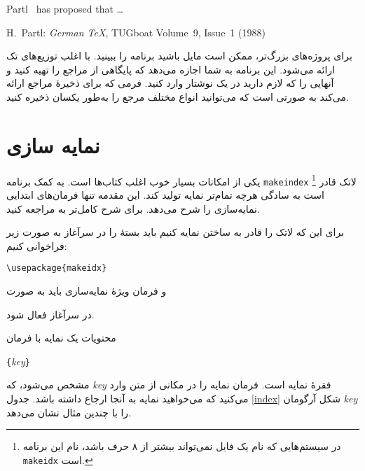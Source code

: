 {{\makeatletter
\def\@makeschapterhead#1{%
  \vspace*{50\p@}%
  {\parindent \z@ \raggedright
    \normalfont
    \interlinepenalty\@M
    \Huge \bfseries  #1\par\nobreak
    \vskip 40\p@
  }
\makeatother	}  
\begin{example}
Partl~\cite{pa} has 
proposed that \ldots 
\begin{thebibliography}{99}
 H.~Partl: 
\emph{German \TeX},
TUGboat Volume~9, Issue~1 (1988)
\end{thebibliography}
\end{example}}
\thispagestyle{fancy}


برای پروژه‌های بزرگ‌تر، ممکن است مایل باشید برنامه  را ببینید.  با اغلب توزیع‌های تک ارائه می‌شود. این برنامه به شما اجازه می‌دهد که پایگاهی از مراجع را تهیه کنید و آنهایی را که لازم دارید در یک نوشتار‌ وارد کنید. فرمی که  برای ذخیرهٔ مراجع ارائه می‌کند به صورتی است که می‌توانید انواع مختلف مرجع را به‌طور یکسان ذخیره کنید.


\section{نمایه سازی}\label{sec:indexing}
یکی از امکانات بسیار خوب اغلب کتاب‌ها  
است. به کمک برنامه 
\texttt{makeindex} 
\footnote{در سیستم‌هایی که نام یک فایل نمی‌تواند بیشتر از ۸ حرف باشد، نام این برنامه \texttt{makeidx} است.} 
لاتک قادر است به سادگی هرچه تمام‌تر نمایه تولید کند. این مقدمه تنها فرمان‌های ابتدایی نمایه‌سازی را شرح می‌دهد. برای شرح کامل‌تر به  \companion مراجعه کنید.   

برای این که لاتک را قادر به ساختن نمایه کنیم باید بستهٔ 
 را در سرآغاز به صورت زیر فراخوانی کنیم:
\begin{lscommand}
\verb|\usepackage{makeidx}|
\end{lscommand}
\noindent و فرمان ویژهٔ نمایه‌سازی باید به صورت 
\begin{lscommand}
\end{lscommand}
\noindent در سرآغاز فعال شود.

محتویات یک نمایه با فرمان
\begin{lscommand}
  \verb|{|\emph{key}\verb|}|
\end{lscommand}
\noindent 
مشخص می‌شود، که 
\emph{key} 
فقرهٔ نمایه است. فرمان نمایه را در مکانی از متن وارد می‌کنید که می‌خواهید نمایه به آنجا ارجاع داشته باشد. جدول 
\ref{index}
شکل آرگومان 
\emph{key} 
را با چندین مثال نشان می‌دهد.

}
